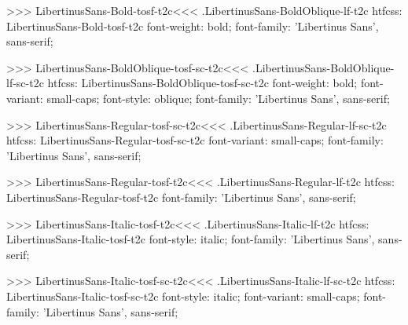 {{{{{{{{{{>>>
\<LibertinusSans-Bold-tosf-t2c\><<<
.LibertinusSans-BoldOblique-lf-t2c
htfcss:  LibertinusSans-Bold-tosf-t2c  font-weight: bold; font-family: 'Libertinus Sans', sans-serif;

>>>
\<LibertinusSans-BoldOblique-tosf-sc-t2c\><<<
.LibertinusSans-BoldOblique-lf-sc-t2c
htfcss:  LibertinusSans-BoldOblique-tosf-sc-t2c  font-weight: bold; font-variant: small-caps; font-style: oblique; font-family: 'Libertinus Sans', sans-serif;

>>>
\<LibertinusSans-Regular-tosf-sc-t2c\><<<
.LibertinusSans-Regular-lf-sc-t2c
htfcss:  LibertinusSans-Regular-tosf-sc-t2c  font-variant: small-caps; font-family: 'Libertinus Sans', sans-serif;

>>>
\<LibertinusSans-Regular-tosf-t2c\><<<
.LibertinusSans-Regular-lf-t2c
htfcss:  LibertinusSans-Regular-tosf-t2c  font-family: 'Libertinus Sans', sans-serif;

>>>
\<LibertinusSans-Italic-tosf-t2c\><<<
.LibertinusSans-Italic-lf-t2c
htfcss:  LibertinusSans-Italic-tosf-t2c  font-style: italic; font-family: 'Libertinus Sans', sans-serif;

>>>
\<LibertinusSans-Italic-tosf-sc-t2c\><<<
.LibertinusSans-Italic-lf-sc-t2c
htfcss:  LibertinusSans-Italic-tosf-sc-t2c  font-style: italic; font-variant: small-caps; font-family: 'Libertinus Sans', sans-serif;

}}}}}}}}}}
